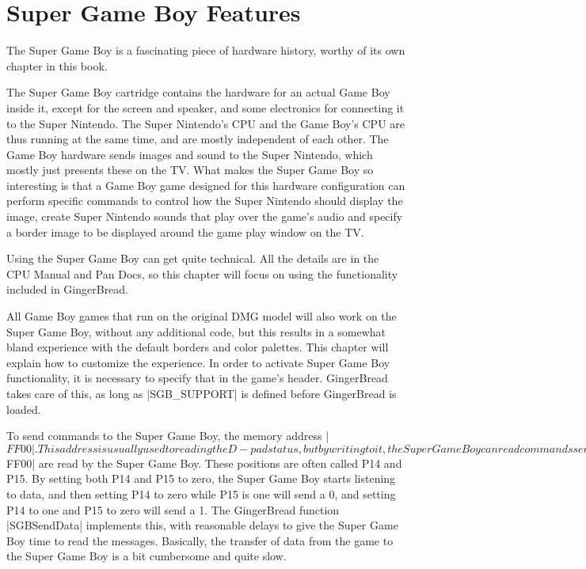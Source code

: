 \documentclass[11pt]{book}
\begin{document}
\chapter{Super Game Boy Features}
\label{sgb}
The Super Game Boy is a fascinating piece of hardware history, worthy of its own chapter in this book. 

The Super Game Boy cartridge contains the hardware for an actual Game Boy inside it, except for the screen and speaker, and some electronics for connecting it to the Super Nintendo. The Super Nintendo's CPU and the Game Boy's CPU are thus running at the same time, and are mostly independent of each other. The Game Boy hardware sends images and sound to the Super Nintendo, which mostly just presents these on the TV. What makes the Super Game Boy so interesting is that a Game Boy game designed for this hardware configuration can perform specific commands to control how the Super Nintendo should display the image, create Super Nintendo sounds that play over the game's audio and specify a border image to be displayed around the game play window on the TV.

Using the Super Game Boy can get quite technical. All the details are in the CPU Manual and Pan Docs, so this chapter will focus on using the functionality included in GingerBread.

All Game Boy games that run on the original DMG model will also work on the Super Game Boy, without any additional code, but this results in a somewhat bland experience with the default borders and color palettes. This chapter will explain how to customize the experience. In order to activate Super Game Boy functionality, it is necessary to specify that in the game's header. GingerBread takes care of this, as long as |SGB_SUPPORT| is defined before GingerBread is loaded.

To send commands to the Super Game Boy, the memory address |$FF00|. This address is usually used to reading the D-pad status, but by writing to it, the Super Game Boy can read commands sent from the game. Because many games will use interrupts that react to button presses, interrupts should be disabled whenever messages are sent to the Super Game Boy.

Only the bits at positions 4 and 5 of |$FF00| are read by the Super Game Boy. These positions are often called P14 and P15. By setting both P14 and P15 to zero, the Super Game Boy starts listening to data, and then setting P14 to zero while P15 is one will send a 0, and setting P14 to one and P15 to zero will send a 1. The GingerBread function |SGBSendData| implements this, with reasonable delays to give the Super Game Boy time to read the messages. Basically, the transfer of data from the game to the Super Game Boy is a bit cumbersome and quite slow.
\end{document}
